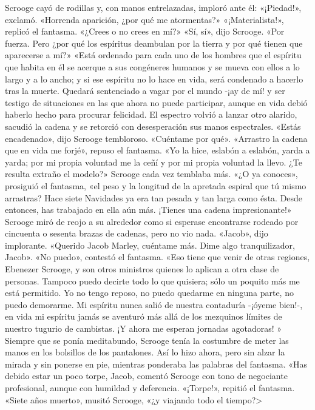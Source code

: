 \documentclass{novela}
\begin{document}
 Scrooge cayó de rodillas y, con manos entrelazadas, imploró ante él:
 «¡Piedad!», exclamó. «Horrenda aparición, ¿por qué me atormentas?»
 «¡Materialista!», replicó el fantasma. «¿Crees o no crees en mí?»
 «Sí, sí», dijo Scrooge. «Por fuerza. Pero ¿por qué los espíritus deambulan por la tierra y por qué tienen que aparecerse a mí?»
 «Está ordenado para cada uno de los hombres que el espíritu que habita en él se acerque a sus congéneres humanos y se mueva con ellos a lo largo y a lo ancho; y si ese espíritu no lo hace en vida, será condenado a hacerlo tras la muerte.
 Quedará sentenciado a vagar por el mundo -¡ay de mí! y ser testigo de situaciones en las que ahora no puede participar, aunque en vida debió haberlo hecho para procurar felicidad.
 El espectro volvió a lanzar otro alarido, sacudió la cadena y se retorció con desesperación sus manos espectrales.
 «Estás encadenado», dijo Scrooge tembloroso. «Cuéntame por qué».
 «Arrastro la cadena que en vida me forjé», repuso el fantasma. «Yo la hice, eslabón a eslabón, yarda a yarda; por mi propia voluntad me la ceñí y por mi propia voluntad la llevo. ¿Te resulta extraño el modelo?»
 Scrooge cada vez temblaba más.
 «¿O ya conoces», prosiguió el fantasma, «el peso y la longitud de la apretada espiral que tú mismo arrastras? Hace siete Navidades ya era tan pesada y tan larga como ésta. Desde entonces, has trabajado en ella aún más. ¡Tienes una cadena impresionante!»
 Scrooge miró de reojo a su alrededor como si esperase encontrarse rodeado por cincuenta o sesenta brazas de cadenas, pero no vio nada.
 «Jacob», dijo implorante. «Querido Jacob Marley, cuéntame más. Dime algo tranquilizador, Jacob».
 «No puedo», contestó el fantasma. «Eso tiene que venir de otras regiones, Ebenezer Scrooge, y son otros ministros quienes lo aplican a otra clase de personas. Tampoco puedo decirte todo lo que quisiera; sólo un poquito más me está permitido. Yo no tengo reposo, no puedo quedarme en ninguna parte, no puedo demorarme. Mi espíritu nunca salió de nuestra contaduría -¡óyeme bien!-, en vida mi espíritu jamás se aventuró más allá de los mezquinos límites de nuestro tugurio de cambistas. ¡Y ahora me esperan jornadas agotadoras! »
 Siempre que se ponía meditabundo, Scrooge tenía la costumbre de meter las manos en los bolsillos de los pantalones. Así lo hizo ahora, pero sin alzar la mirada y sin ponerse en pie, mientras ponderaba las palabras del fantasma.
 «Has debido estar un poco torpe, Jacob, comentó Scrooge con tono de negociante profesional, aunque con humildad y deferencia.
 «¡Torpe!», repitió el fantasma.
 «Siete años muerto», musitó Scrooge, «¿y viajando todo el tiempo?>
\end{document}
